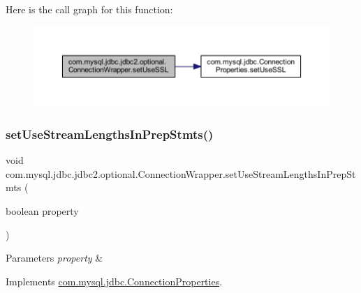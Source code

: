 Here is the call graph for this function\+:
\nopagebreak
\begin{figure}[H]
\begin{center}
\leavevmode
\includegraphics[width=350pt]{classcom_1_1mysql_1_1jdbc_1_1jdbc2_1_1optional_1_1_connection_wrapper_afe754fe2674d4bbab1ba44cb09a81db6_cgraph}
\end{center}
\end{figure}
\mbox{\label{classcom_1_1mysql_1_1jdbc_1_1jdbc2_1_1optional_1_1_connection_wrapper_a9eadd4adb9ecde242f0656084f31f8c7}} 
\subsubsection{\texorpdfstring{set\+Use\+Stream\+Lengths\+In\+Prep\+Stmts()}{setUseStreamLengthsInPrepStmts()}}
{\footnotesize\ttfamily void com.\+mysql.\+jdbc.\+jdbc2.\+optional.\+Connection\+Wrapper.\+set\+Use\+Stream\+Lengths\+In\+Prep\+Stmts (\begin{DoxyParamCaption}\item[{boolean}]{property }\end{DoxyParamCaption})}


\begin{DoxyParams}{Parameters}
{\em property} & \\
\hline
\end{DoxyParams}


Implements \mbox{\hyperlink{interfacecom_1_1mysql_1_1jdbc_1_1_connection_properties_a34c1ecb9d6258a0289516696cf8537be}{com.\+mysql.\+jdbc.\+Connection\+Properties}}.

